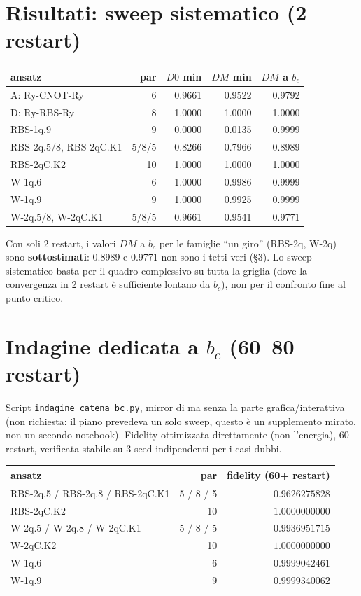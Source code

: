 \documentclass[11pt,a4paper]{article}
\begin{document}
\section*{Risultati: sweep sistematico (2 restart)}

\begin{center}
\renewcommand{\arraystretch}{1.2}
\begin{tabular}{lrrrr}
\toprule
ansatz & par & $D0$ min & $DM$ min & $DM$ a $b_c$ \\
\midrule
A: Ry-CNOT-Ry & 6 & 0.9661 & 0.9522 & 0.9792 \\
D: Ry-RBS-Ry  & 8 & 1.0000 & 1.0000 & 1.0000 \\
RBS-1q.9      & 9 & 0.0000 & 0.0135 & 0.9999 \\
RBS-2q.5/8, RBS-2qC.K1 & 5/8/5 & 0.8266 & 0.7966 & 0.8989 \\
RBS-2qC.K2    & 10 & 1.0000 & 1.0000 & 1.0000 \\
W-1q.6        & 6 & 1.0000 & 0.9986 & 0.9999 \\
W-1q.9        & 9 & 1.0000 & 0.9925 & 0.9999 \\
W-2q.5/8, W-2qC.K1 & 5/8/5 & 0.9661 & 0.9541 & 0.9771 \\
\bottomrule
\end{tabular}
\end{center}

Con soli 2 restart, i valori $DM$ a $b_c$ per le famiglie ``un giro'' (RBS-2q,
W-2q) sono \textbf{sottostimati}: 0.8989 e 0.9771 non sono i tetti veri (§3). Lo
sweep sistematico basta per il quadro complessivo su tutta la griglia (dove la
convergenza in 2 restart è sufficiente lontano da $b_c$), non per il confronto fine
al punto critico.

\section*{Indagine dedicata a \texorpdfstring{$b_c$}{b\_c} (60--80 restart)}

Script \texttt{indagine\_catena\_bc.py}, mirror di
\texttt{} ma senza la parte
grafica/interattiva (non richiesta: il piano prevedeva un solo sweep, questo è un
supplemento mirato, non un secondo notebook). Fidelity ottimizzata direttamente
(non l'energia), 60 restart, verificata stabile su 3 seed indipendenti per i casi
dubbi.

\begin{center}
\renewcommand{\arraystretch}{1.2}
\begin{tabular}{lrr}
\toprule
ansatz & par & fidelity (60+ restart) \\
\midrule
RBS-2q.5 / RBS-2q.8 / RBS-2qC.K1 & 5 / 8 / 5 & $0.9626275828$ \\
RBS-2qC.K2 & 10 & $1.0000000000$ \\
W-2q.5 / W-2q.8 / W-2qC.K1 & 5 / 8 / 5 & $0.9936951715$ \\
W-2qC.K2 & 10 & $1.0000000000$ \\
W-1q.6 & 6 & $0.9999042461$ \\
W-1q.9 & 9 & $0.9999340062$ \\
\bottomrule
\end{tabular}
\end{center}
\end{document}
